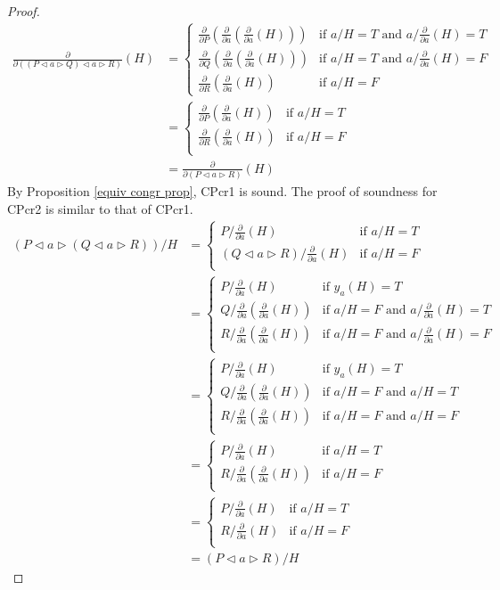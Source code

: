 \documentclass[a4paper,twoside,openright]{report}
\newcommand{\dd}[1]{\frac{\partial}{\partial #1}}
\newcommand{\lef}{\ensuremath{\triangleleft}}
\newcommand{\rig}{\ensuremath{\triangleright}}
\begin{document}
\begin{proof}
\begin{align*}
\dd{((P\lef a\rig Q)\lef a\rig R)}(H)
&=\begin{cases}
\dd P(\dd a(\dd a(H))) & \text{if $a/H=T$ and $a/\dd a(H)=T$}\\
\dd Q(\dd a(\dd a(H))) & \text{if $a/H=T$ and $a/\dd a(H)=F$}\\
\dd R(\dd a(H)) & \text{if $a/H=F$}
\end{cases}\\
&=\begin{cases}
\dd P(\dd a(H)) & \text{if $a/H=T$}\\
\dd R(\dd a(H)) & \text{if $a/H=F$}\\
\end{cases}\\
&=\dd{(P\lef a\rig R)}(H)
\end{align*}
By Proposition \ref{equiv congr prop}, CPcr1 is sound. The proof of soundness for CPcr2 is similar to that of CPcr1.
\begin{align*}
(P\lef a\rig (Q\lef a\rig R))/H
&=\begin{cases}
P/\dd a(H) & \text{if $a/H=T$}\\
(Q\lef a\rig R)/\dd a(H) & \text{if $a/H=F$}\\
\end{cases}\\
&=\begin{cases}
P/\dd a(H) & \text{if $y_a(H)=T$}\\
Q/\dd a(\dd a(H)) & \text{if $a/H=F$ and $a/\dd a(H)=T$}\\
R/\dd a(\dd a(H)) & \text{if $a/H=F$ and $a/\dd a(H)=F$}\\
\end{cases}\\
&=\begin{cases}
P/\dd a(H) & \text{if $y_a(H)=T$}\\
Q/\dd a(\dd a(H)) & \text{if $a/H=F$ and $a/H=T$}\\
R/\dd a(\dd a(H)) & \text{if $a/H=F$ and $a/H=F$}\\
\end{cases}\\
&=\begin{cases}
P/\dd a(H) & \text{if $a/H=T$}\\
R/\dd a(\dd a(H)) & \text{if $a/H=F$}\\
\end{cases}\\
&=\begin{cases}
P/\dd a(H) & \text{if $a/H=T$}\\
R/\dd a(H) & \text{if $a/H=F$}\\
\end{cases}\\
&=(P\lef a\rig R)/H
\end{align*}


\end{proof}
\end{document}
